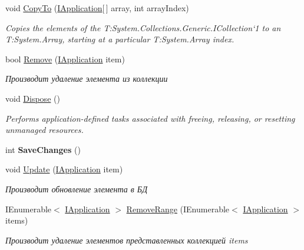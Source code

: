 \begin{DoxyCompactItemize}
void \hyperlink{class_security_1_1_entity_framework_1_1_collections_1_1_application_collection_abd644783e0ae7cd9f2e730a8d8991921}{Copy\+To} (\hyperlink{interface_security_1_1_interfaces_1_1_model_1_1_i_application}{I\+Application}\mbox{[}$\,$\mbox{]} array, int array\+Index)
\begin{DoxyCompactList}\small\item\em Copies the elements of the T\+:\+System.\+Collections.\+Generic.\+I\+Collection`1 to an T\+:\+System.\+Array, starting at a particular T\+:\+System.\+Array index. \end{DoxyCompactList}\item 
bool \hyperlink{class_security_1_1_entity_framework_1_1_collections_1_1_application_collection_a7612426cd9f9f7dcebb1ca1aeb9cd986}{Remove} (\hyperlink{interface_security_1_1_interfaces_1_1_model_1_1_i_application}{I\+Application} item)
\begin{DoxyCompactList}\small\item\em Производит удаление элемента из коллекции \end{DoxyCompactList}\item 
void \hyperlink{class_security_1_1_entity_framework_1_1_collections_1_1_application_collection_adef85e538bfbe1df288513c241b3c199}{Dispose} ()
\begin{DoxyCompactList}\small\item\em Performs application-\/defined tasks associated with freeing, releasing, or resetting unmanaged resources. \end{DoxyCompactList}\item 
\mbox{\label{class_security_1_1_entity_framework_1_1_collections_1_1_application_collection_a3b0a39f6b252fa6bbfe93c85e06a7144}} 
int {\bfseries Save\+Changes} ()
\item 
void \hyperlink{class_security_1_1_entity_framework_1_1_collections_1_1_application_collection_a9faf9ac9440cccea84fb29a0d4c67f59}{Update} (\hyperlink{interface_security_1_1_interfaces_1_1_model_1_1_i_application}{I\+Application} item)
\begin{DoxyCompactList}\small\item\em Производит обновление элемента в БД \end{DoxyCompactList}\item 
I\+Enumerable$<$ \hyperlink{interface_security_1_1_interfaces_1_1_model_1_1_i_application}{I\+Application} $>$ \hyperlink{class_security_1_1_entity_framework_1_1_collections_1_1_application_collection_ad11e3582f6b2b46a6f01756edd246e0f}{Remove\+Range} (I\+Enumerable$<$ \hyperlink{interface_security_1_1_interfaces_1_1_model_1_1_i_application}{I\+Application} $>$ items)
\begin{DoxyCompactList}\small\item\em Производит удаление элементов представленных коллекцией items \end{DoxyCompactList}\end{DoxyCompactItemize}
